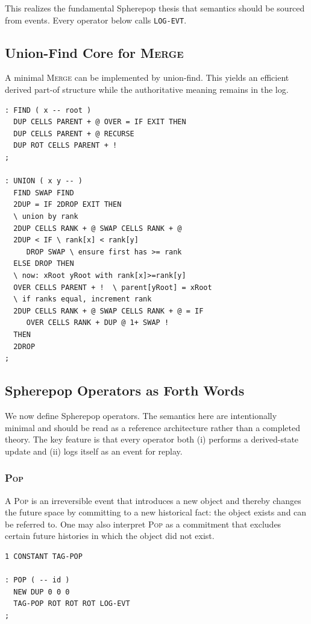 \documentclass[11pt]{article}
\begin{document}
This realizes the fundamental Spherepop thesis that semantics should be sourced
from events. Every operator below calls \texttt{LOG-EVT}.

\subsection{Union-Find Core for \textsc{Merge}}

A minimal \textsc{Merge} can be implemented by union-find. This yields an
efficient derived part-of structure while the authoritative meaning remains in
the log.

\begin{verbatim}
: FIND ( x -- root )
  DUP CELLS PARENT + @ OVER = IF EXIT THEN
  DUP CELLS PARENT + @ RECURSE
  DUP ROT CELLS PARENT + !
;

: UNION ( x y -- )
  FIND SWAP FIND
  2DUP = IF 2DROP EXIT THEN
  \ union by rank
  2DUP CELLS RANK + @ SWAP CELLS RANK + @
  2DUP < IF \ rank[x] < rank[y]
     DROP SWAP \ ensure first has >= rank
  ELSE DROP THEN
  \ now: xRoot yRoot with rank[x]>=rank[y]
  OVER CELLS PARENT + !  \ parent[yRoot] = xRoot
  \ if ranks equal, increment rank
  2DUP CELLS RANK + @ SWAP CELLS RANK + @ = IF
     OVER CELLS RANK + DUP @ 1+ SWAP !
  THEN
  2DROP
;
\end{verbatim}

\subsection{Spherepop Operators as Forth Words}

We now define Spherepop operators. The semantics here are intentionally minimal
and should be read as a reference architecture rather than a completed theory.
The key feature is that every operator both (i) performs a derived-state update
and (ii) logs itself as an event for replay.

\subsubsection{\textsc{Pop}}

A \textsc{Pop} is an irreversible event that introduces a new object and
thereby changes the future space by committing to a new historical fact: the
object exists and can be referred to. One may also interpret \textsc{Pop} as a
commitment that excludes certain future histories in which the object did not
exist.

\begin{verbatim}
1 CONSTANT TAG-POP

: POP ( -- id )
  NEW DUP 0 0 0
  TAG-POP ROT ROT ROT LOG-EVT
;
\end{verbatim}
\end{document}
